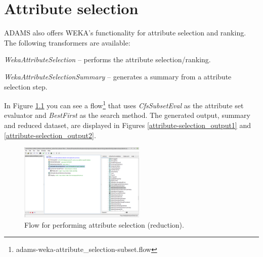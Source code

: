 
\chapter{Attribute selection}
\label{attribute_selection}
ADAMS also offers WEKA's functionality for attribute selection and ranking.
The following transformers are available:
\begin{tight_itemize}
	\item \textit{WekaAttributeSelection} -- performs the attribute 
	selection/ranking.
	\item \textit{WekaAttributeSelectionSummary} -- generates a summary from
	a attribute selection step.
\end{tight_itemize}

In Figure \ref{attribute-selection_flow} you can see a flow\footnote{adams-weka-attribute\_selection-subset.flow} 
that uses \textit{CfsSubsetEval} as the attribute set evaluator and \textit{BestFirst}
as the search method. The generated output, summary and reduced dataset,
are displayed in Figures \ref{attribute-selection_output1} and 
\ref{attribute-selection_output2}.

\begin{figure}[htb]
  \centering
  \includegraphics[width=6.0cm]{images/attribute-selection_flow.png}
  \caption{Flow for performing attribute selection (reduction).}
  \label{attribute-selection_flow}
\end{figure}

